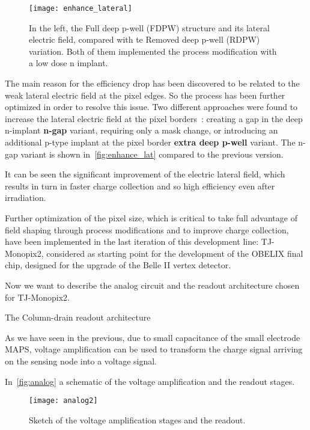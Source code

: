 \begin{figure}[h!]
\centering
\texttt{[image: enhance\_lateral]}
\caption{In the left, the Full deep p-well (FDPW) structure and its lateral electric field, compared with te Removed deep p-well (RDPW) variation. Both of them implemented the process modification with a low dose n implant.}
\label{fig:enhance_lat}
\end{figure}


The main reason for the efficiency drop has been discovered to be related to the weak lateral electric field at the pixel edges. So the process has been further optimized in order to resolve this issue. Two different approaches were found to increase the lateral electric field at the pixel borders~\cite{Munker_2019}: creating a gap in the deep n-implant \textbf{n-gap} variant, requiring only a mask change, or introducing an additional p-type implant at the pixel border \textbf{extra deep p-well} variant. The n-gap variant is shown in~\autoref{fig:enhance_lat} compared to the previous version.

It can be seen the significant improvement of the electric lateral field, which results in turn in faster charge collection and so high efficiency even after irradiation. 

Further optimization of the pixel size, which is critical to take full advantage of field shaping through process modifications and to improve charge collection, have been implemented in the last iteration of this development line: TJ-Monopix2, considered as starting point for the development of the OBELIX final chip, designed for the upgrade of the Belle II vertex detector.  

Now we want to describe the analog circuit and the readout architecture chosen for TJ-Monopix2. 


\begin{description}
\item[The Column-drain readout architecture]
\end{description}

As we have seen in the previous, due to small capacitance of the small electrode MAPS, voltage amplification can be used to transform the charge signal arriving on the sensing node into a voltage signal. 

In~\autoref{fig:analog} a schematic of the voltage amplification and the readout stages.

\begin{figure}[h!]
\centering
\texttt{[image: analog2]}
\caption{Sketch of the voltage amplification stages and the readout.}
\label{fig:analog}
\end{figure}

